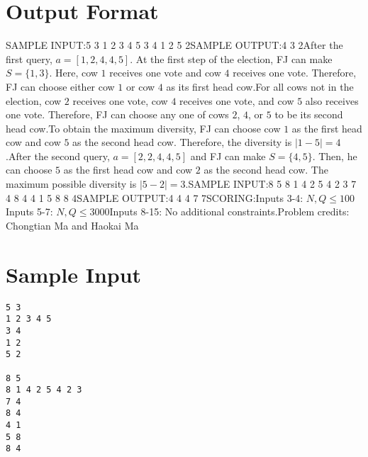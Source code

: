 \documentclass[12pt]{article}
\begin{document}
\section*{Output Format}
SAMPLE INPUT:5 3
1 2 3 4 5
3 4
1 2
5 2SAMPLE OUTPUT:4
3
2After the first query, $a = [1, 2, 4, 4, 5]$. At the first step of the election,
FJ can make $S = \{1, 3\}$. Here, cow $1$ receives one vote and cow $4$ receives
one vote.  Therefore, FJ can choose either cow $1$ or cow $4$ as its first head
cow.For all cows not in the election, cow $2$ receives one vote, cow $4$ receives
one vote, and cow $5$ also receives one vote. Therefore, FJ can choose any one
of cows $2$, $4$, or $5$ to be its second head cow.To obtain the maximum diversity, FJ can choose cow $1$ as the first head cow and
cow $5$ as the second head cow. Therefore, the diversity is $|1-5| = 4$.After the second query, $a=[2,2,4,4,5]$ and FJ can make $S = \{4, 5\}$. Then, he
can choose $5$ as the first head cow and cow $2$ as the second head cow. The
maximum possible diversity is
$|5 - 2| = 3$.SAMPLE INPUT:8 5
8 1 4 2 5 4 2 3
7 4
8 4
4 1
5 8
8 4SAMPLE OUTPUT:4
4
4
7
7SCORING:Inputs 3-4: $N, Q \leq 100$Inputs 5-7: $N, Q \leq 3000$Inputs 8-15:  No additional constraints.Problem credits: Chongtian Ma and Haokai Ma

\section*{Sample Input}
\begin{verbatim}
5 3
1 2 3 4 5
3 4
1 2
5 2

8 5
8 1 4 2 5 4 2 3
7 4
8 4
4 1
5 8
8 4
\end{verbatim}
\end{document}
